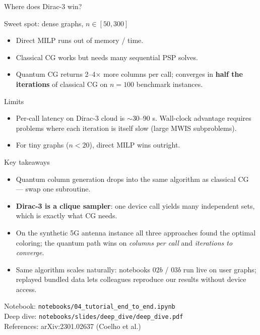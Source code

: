 \documentclass[aspectratio=169,11pt]{beamer}
\newcommand{\bestval}[1]{\textbf{\textcolor{qciteal}{#1}}}
\begin{document}
\begin{frame}{Where does Dirac-3 win?}
  \begin{block}{Sweet spot: dense graphs, $n \in [50, 300]$}
    \begin{itemize}\small
      \item Direct MILP runs out of memory / time.
      \item Classical CG works but needs many sequential PSP solves.
      \item Quantum CG returns 2--4$\times$ more columns per call;
            converges in \bestval{half the iterations} of classical CG
            on $n = 100$ benchmark instances.
    \end{itemize}
  \end{block}

  \medskip
  \begin{block}{Limits}
    \begin{itemize}\small
      \item Per-call latency on Dirac-3 cloud is $\sim$30--90 s. Wall-clock
            advantage requires problems where each iteration is itself slow
            (large MWIS subproblems).
      \item For tiny graphs ($n < 20$), direct MILP wins outright.
    \end{itemize}
  \end{block}
\end{frame}

\begin{frame}{Key takeaways}
  \begin{itemize}
    \item Quantum column generation \alert{drops into the same algorithm}
          as classical CG --- swap one subroutine.
    \item \textbf{Dirac-3 is a clique sampler}: one device call yields many
          independent sets, which is exactly what CG needs.
    \item On the synthetic 5G antenna instance all three approaches found
          the optimal coloring; the quantum path wins on
          \emph{columns per call} and \emph{iterations to converge}.
    \item Same algorithm scales naturally: notebooks $02b$ / $03b$ run live
          on user graphs; replayed bundled data lets colleagues reproduce
          our results without device access.
  \end{itemize}

  \vspace{0.4em}
  \footnotesize
  Notebook: \texttt{notebooks/04\_tutorial\_end\_to\_end.ipynb}\\
  Deep dive: \texttt{notebooks/slides/deep\_dive/deep\_dive.pdf}\\
  References: arXiv:2301.02637 (Coelho et al.)
\end{frame}
\end{document}
